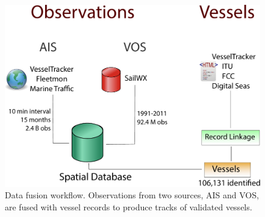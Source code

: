 \begin{figure}
  \centering
  \includegraphics[width=130mm]{figures/record-workflow-myriad.pdf}
  \caption[Data fusion workflow]{Data fusion workflow. Observations from two sources, AIS and VOS, are fused with vessel records to produce tracks of validated vessels.}
  \label{fig:record-workflow}
\end{figure}


